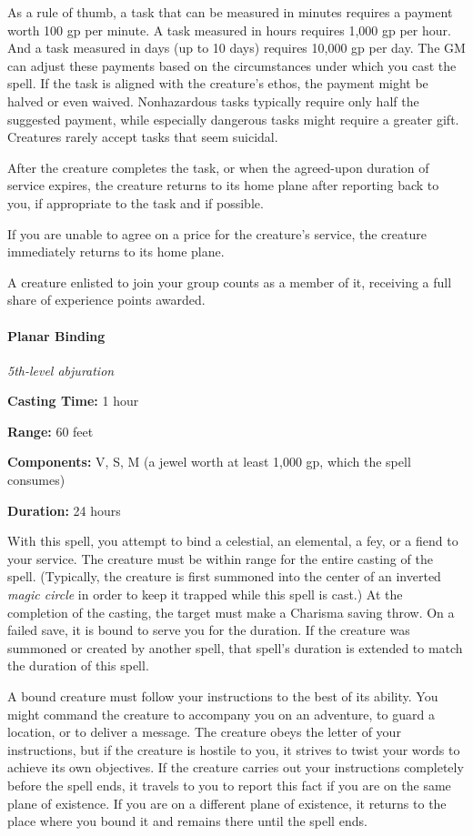 \documentclass[
]{article}
\begin{document}
As a rule of thumb, a task that can be measured in minutes requires a
payment worth 100 gp per minute. A task measured in hours requires 1,000
gp per hour. And a task measured in days (up to 10 days) requires 10,000
gp per day. The GM can adjust these payments based on the circumstances
under which you cast the spell. If the task is aligned with the
creature's ethos, the payment might be halved or even waived.
Nonhazardous tasks typically require only half the suggested payment,
while especially dangerous tasks might require a greater gift. Creatures
rarely accept tasks that seem suicidal.

After the creature completes the task, or when the agreed-upon duration
of service expires, the creature returns to its home plane after
reporting back to you, if appropriate to the task and if possible.

If you are unable to agree on a price for the creature's service, the
creature immediately returns to its home plane.

A creature enlisted to join your group counts as a member of it,
receiving a full share of experience points awarded.

\hypertarget{planar-binding}{%
\paragraph{Planar Binding}\label{planar-binding}}

\emph{5th-level abjuration}

\textbf{Casting Time:} 1 hour

\textbf{Range:} 60 feet

\textbf{Components:} V, S, M (a jewel worth at least 1,000 gp, which the
spell consumes)

\textbf{Duration:} 24 hours

With this spell, you attempt to bind a celestial, an elemental, a fey,
or a fiend to your service. The creature must be within range for the
entire casting of the spell. (Typically, the creature is first summoned
into the center of an inverted \emph{magic circle} in order to keep it
trapped while this spell is cast.) At the completion of the casting, the
target must make a Charisma saving throw. On a failed save, it is bound
to serve you for the duration. If the creature was summoned or created
by another spell, that spell's duration is extended to match the
duration of this spell.

A bound creature must follow your instructions to the best of its
ability. You might command the creature to accompany you on an
adventure, to guard a location, or to deliver a message. The creature
obeys the letter of your instructions, but if the creature is hostile to
you, it strives to twist your words to achieve its own objectives. If
the creature carries out your instructions completely before the spell
ends, it travels to you to report this fact if you are on the same plane
of existence. If you are on a different plane of existence, it returns
to the place where you bound it and remains there until the spell ends.
\end{document}
